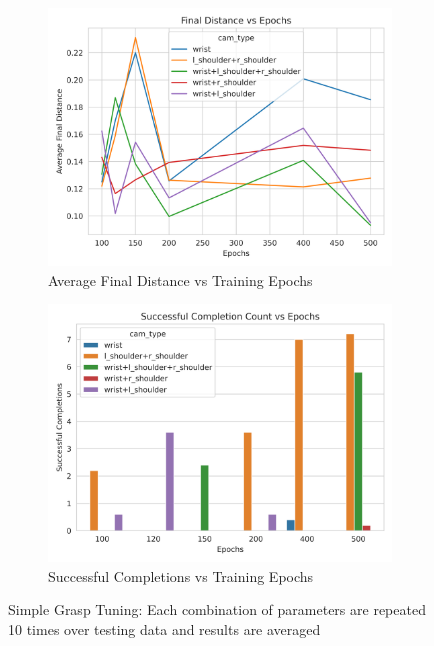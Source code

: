 \begin{figure}[htpb] %
  \centering
  \begin{subfigure}{0.45\linewidth}
    \centering
    \includegraphics[width=\linewidth]{assets/cam-comb/grasp-simple/tuning-normal-old-policy-dist.png}
    \caption{Average Final Distance vs Training Epochs}\label{subfig:grasp-tuning-dist}
  \end{subfigure}
  \begin{subfigure}{0.45\linewidth}
    \centering
    \includegraphics[width=\linewidth]{assets/cam-comb/grasp-simple/tuning-normal-old-policy-success.png}
    \caption{Successful Completions vs Training Epochs}\label{subfig:grasp-tuning-dist-success}
  \end{subfigure}
  \caption{Simple Grasp Tuning: Each combination of parameters are repeated 10 times over testing data and results are averaged}\label{fig:grasp-tuning-epochs}
\end{figure}


